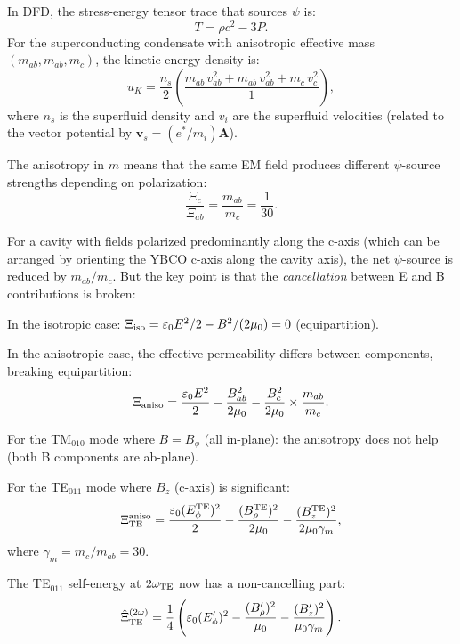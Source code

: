 \documentclass[11pt]{article}
\begin{document}
In DFD, the stress-energy tensor trace that sources $\psi$ is:
\begin{equation}
T = \rho c^2 - 3P.
\end{equation}
For the superconducting condensate with anisotropic effective mass
$(m_{ab}, m_{ab}, m_c)$, the kinetic energy density is:
\begin{equation}
u_K = \frac{n_s}{2}\left(\frac{m_{ab}\,v_{ab}^2 + m_{ab}\,v_{ab}^2
+ m_c\,v_c^2}{1}\right),
\end{equation}
where $n_s$ is the superfluid density and $v_i$ are the superfluid
velocities (related to the vector potential by
$\mathbf{v}_s = (e^*/m_i)\mathbf{A}$).

The anisotropy in $m$ means that the same EM field produces different
$\psi$-source strengths depending on polarization:
\begin{equation}
\frac{\Xi_c}{\Xi_{ab}} = \frac{m_{ab}}{m_c} = \frac{1}{30}.
\end{equation}

For a cavity with fields polarized predominantly along the c-axis
(which can be arranged by orienting the YBCO c-axis along the cavity
axis), the net $\psi$-source is reduced by $m_{ab}/m_c$. But the
key point is that the \emph{cancellation} between E and B
contributions is broken:

In the isotropic case:
$\Xi_{\rm iso} = \varepsilon_0 E^2/2 - B^2/(2\mu_0) = 0$
(equipartition).

In the anisotropic case, the effective permeability differs between
components, breaking equipartition:
\begin{equation}
\Xi_{\rm aniso} = \frac{\varepsilon_0 E^2}{2}
- \frac{B_{ab}^2}{2\mu_0} - \frac{B_c^2}{2\mu_0}
\times \frac{m_{ab}}{m_c}.
\end{equation}

For the TM$_{010}$ mode where $B = B_\phi$ (all in-plane):
the anisotropy does not help (both B components are ab-plane).

For the TE$_{011}$ mode where $B_z$ (c-axis) is significant:
\begin{equation}
\Xi_{\rm TE}^{\rm aniso} = \frac{\varepsilon_0 (E_\phi^{\rm TE})^2}{2}
- \frac{(B_\rho^{\rm TE})^2}{2\mu_0}
- \frac{(B_z^{\rm TE})^2}{2\mu_0\gamma_m},
\end{equation}
where $\gamma_m = m_c/m_{ab} = 30$.

The TE$_{011}$ self-energy at $2\omega_{\rm TE}$ now has a
non-cancelling part:
\begin{equation}
\hat{\Xi}_{\rm TE}^{(2\omega)} = \frac{1}{4}
\left(\varepsilon_0 (E_\phi')^2 - \frac{(B_\rho')^2}{\mu_0}
- \frac{(B_z')^2}{\mu_0\gamma_m}\right).
\end{equation}
\end{document}
